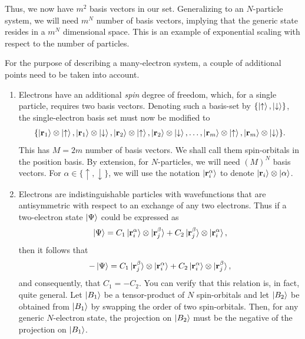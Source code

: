 \documentclass[12pt,oneside]{book}
\begin{document}
Thus, we now have $m^2$ basis vectors in our set. Generalizing to an $N$-particle system, we will need $m^N$ number of basis vectors, implying that the generic state resides in a $m^N$ dimensional space. This is an example of exponential scaling with respect to the number of particles.

For the purpose of describing a many-electron system, a couple of additional points need to be taken into account.
\begin{enumerate}
    \item Electrons have an additional \textit{spin} degree of freedom, which, for a single particle, requires two basis vectors. Denoting such a basis-set by $\{\ket{\uparrow},\ket{\downarrow}\}$, the single-electron basis set must now be modified to 
    \begin{align*}
        \{\ket{\mathbf{r}_1}\otimes\ket{\uparrow}, \ket{\mathbf{r}_1}\otimes\ket{\downarrow}, \ket{\mathbf{r}_2}\otimes\ket{\uparrow}, \ket{\mathbf{r}_2}\otimes\ket{\downarrow},\hdots, \ket{\mathbf{r}_m}\otimes\ket{\uparrow}, \ket{\mathbf{r}_m}\otimes\ket{\downarrow}\}.
    \end{align*}
    This has $M = 2m$ number of basis vectors.  We shall call them spin-orbitals in the position basis. By extension, for $N$-particles, we will need $(M)^N$ basis vectors. For $\alpha \in \{\uparrow,\downarrow\}$, we will use the notation $\ket{\mathbf{r}_i^\alpha}$ to denote $\ket{\mathbf{r}_i}\otimes\ket{\alpha}$.
    \item Electrons are indistinguishable particles with wavefunctions that are antisymmetric with respect to an exchange of any two electrons. Thus if a two-electron state $\ket{\Psi}$ could be expressed as
    \begin{align*}
        \ket{\Psi}=C_1\ket{\mathbf{r}_i^\alpha}\otimes\ket{\mathbf{r}_j^\beta} + C_2 \ket{\mathbf{r}_j^\beta} \otimes \ket{\mathbf{r}_i^\alpha},
    \end{align*}
    then it follows that
    \begin{align*}
        -\ket{\Psi}= C_1 \ket{\mathbf{r}_j^\beta} \otimes \ket{\mathbf{r}_i^\alpha} + C_2 \ket{\mathbf{r}_i^\alpha}\otimes\ket{\mathbf{r}_j^\beta},
    \end{align*}
    and consequently, that $C_1 = -C_2$. You can verify that this relation is, in fact, quite general. Let $\ket{B_1}$ be a tensor-product of $N$ spin-orbitals and let $\ket{B_2}$ be obtained from $\ket{B_1}$ by swapping the order of two spin-orbitals. Then, for any generic $N$-electron state, the projection on $\ket{B_2}$ must be the negative of the projection on $\ket{B_1}$.
    

\end{enumerate}
\end{document}
